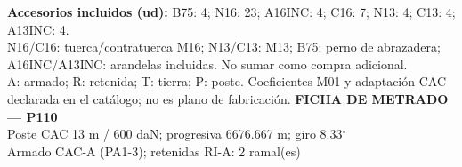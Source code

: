 \begingroup\scriptsize
\textbf{Accesorios incluidos (ud):} B75: 4; N16: 23; A16INC: 4; C16: 7; N13: 4; C13: 4; A13INC: 4.\\
N16/C16: tuerca/contratuerca M16; N13/C13: M13; B75: perno de abrazadera; A16INC/A13INC: arandelas incluidas. No sumar como compra adicional.\\
A: armado; R: retenida; T: tierra; P: poste. Coeficientes M01 y adaptación CAC declarada en el catálogo; no es plano de fabricación.
\endgroup\endgroup
\clearpage{}
\begingroup\small\setlength{\parskip}{3pt}\renewcommand{\arraystretch}{1.05}
\textbf{\large FICHA DE METRADO — P110}\\[4pt]
Poste CAC 13 m / 600 daN; progresiva 6676.667 m; giro 8.33\ensuremath{^\circ}\\
Armado CAC-A (PA1-3); retenidas RI-A: 2 ramal(es)\\
\begingroup\scriptsize
